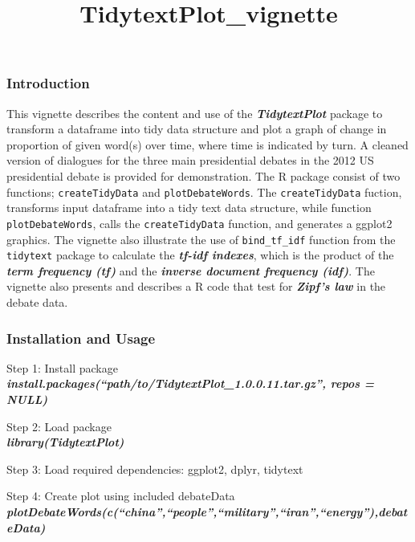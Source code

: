 \documentclass[
]{article}
\title{TidytextPlot\_vignette}
\author{}
\date{\vspace{-2.5em}}
\begin{document}
\maketitle

\hypertarget{introduction}{%
\subsubsection{Introduction}\label{introduction}}

This vignette describes the content and use of the
\textbf{\emph{TidytextPlot}} package to transform a dataframe into tidy
data structure and plot a graph of change in proportion of given word(s)
over time, where time is indicated by turn. A cleaned version of
dialogues for the three main presidential debates in the 2012 US
presidential debate is provided for demonstration. The R package consist
of two functions; \texttt{createTidyData} and \texttt{plotDebateWords}.
The \texttt{createTidyData} fuction, transforms input dataframe into a
tidy text data structure, while function \texttt{plotDebateWords}, calls
the \texttt{createTidyData} function, and generates a ggplot2 graphics.
The vignette also illustrate the use of \texttt{bind\_tf\_idf} function
from the \texttt{tidytext} package to calculate the \textbf{\emph{tf-idf
indexes}}, which is the product of the \textbf{\emph{term frequency
(tf)}} and the \textbf{\emph{inverse document frequency (idf)}}. The
vignette also presents and describes a R code that test for
\textbf{\emph{Zipf's law}} in the debate data.\\

\hypertarget{installation-and-usage}{%
\subsubsection{Installation and Usage}\label{installation-and-usage}}

Step 1: Install package\\
\textbf{\emph{install.packages(``path/to/TidytextPlot\_1.0.0.11.tar.gz'',
repos = NULL)}}

Step 2: Load package\\
\textbf{\emph{library(TidytextPlot)}}

Step 3: Load required dependencies: ggplot2, dplyr, tidytext

Step 4: Create plot using included debateData\\
\textbf{\emph{plotDebateWords(c(``china'',``people'',``military'',``iran'',``energy''),debateData)}}
\end{document}

